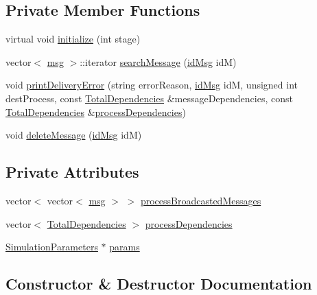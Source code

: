 \subsection*{Private Member Functions}
\begin{DoxyCompactItemize}
\item 
virtual void \hyperlink{class_controller_aa813a54b625a16ee0c039838b8cdd661}{initialize} (int stage)
\item 
vector$<$ \hyperlink{_controller_8h_afa0f3b802fbc219228f7bb97996fa558}{msg} $>$\+::iterator \hyperlink{class_controller_aa32d5c18e9e30caf2900527e42b93d44}{search\+Message} (\hyperlink{structures_8h_a83a1d9a070efa5341da84cfd8e28d3e5}{id\+Msg} idM)
\item 
void \hyperlink{class_controller_ad43f12368786278dd1171226b666395d}{print\+Delivery\+Error} (string error\+Reason, \hyperlink{structures_8h_a83a1d9a070efa5341da84cfd8e28d3e5}{id\+Msg} idM, unsigned int dest\+Process, const \hyperlink{class_total_dependencies}{Total\+Dependencies} \&message\+Dependencies, const \hyperlink{class_total_dependencies}{Total\+Dependencies} \&\hyperlink{class_controller_ae8234cd96adbdeff4b56a59f6c54df58}{process\+Dependencies})
\item 
void \hyperlink{class_controller_ab250759d5c511ceb8f35fdf9e42583cd}{delete\+Message} (\hyperlink{structures_8h_a83a1d9a070efa5341da84cfd8e28d3e5}{id\+Msg} idM)
\end{DoxyCompactItemize}
\subsection*{Private Attributes}
\begin{DoxyCompactItemize}
\item 
vector$<$ vector$<$ \hyperlink{_controller_8h_afa0f3b802fbc219228f7bb97996fa558}{msg} $>$ $>$ \hyperlink{class_controller_ae96146dee6f60ecd94bfe40b9fc658ad}{process\+Broadcasted\+Messages}
\item 
vector$<$ \hyperlink{class_total_dependencies}{Total\+Dependencies} $>$ \hyperlink{class_controller_ae8234cd96adbdeff4b56a59f6c54df58}{process\+Dependencies}
\item 
\hyperlink{class_simulation_parameters}{Simulation\+Parameters} $\ast$ \hyperlink{class_controller_a81d7fe43b78ef7601e6b36c3df38ce79}{params}
\end{DoxyCompactItemize}


\subsection{Constructor \& Destructor Documentation}
\mbox{\label{class_controller_a95c56822d667e94b031451729ce069a9}} 
